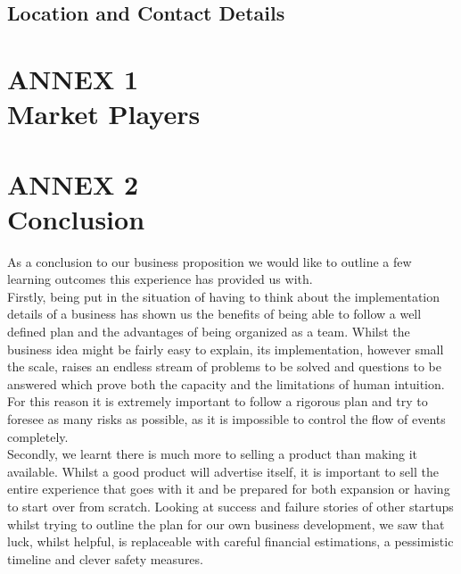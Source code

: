 \documentclass[11pt]{article}
\begin{document}
  \subsection{Location and Contact Details}

\newpage

\section{ANNEX 1 \\ Market Players}


\newpage


\section{ANNEX 2 \\ Conclusion}
As a conclusion to our business proposition we would like to outline a few learning outcomes this experience has provided us with.\\

\noindent Firstly, being put in the situation of having to think about the implementation details of a business has shown us the benefits of being able to follow a well defined plan and the advantages of being organized as a team. Whilst the business idea might be fairly easy to explain, its implementation, however small the scale, raises an endless stream of problems to be solved and questions to be answered which prove both the capacity and the limitations of human intuition. For this reason it is extremely important to follow a rigorous plan and try to foresee as many risks as possible, as it is impossible to control the flow of events completely. \\

\noindent Secondly, we learnt there is much more to selling a product than making it available. Whilst a good product will advertise itself, it is important to sell the entire experience that goes with it and be prepared for both expansion or having to start over from scratch. Looking at success and failure stories of other startups whilst trying to outline the plan for our own business development, we saw that luck, whilst helpful, is replaceable with careful financial estimations, a pessimistic timeline and clever safety measures. \\
\end{document}
